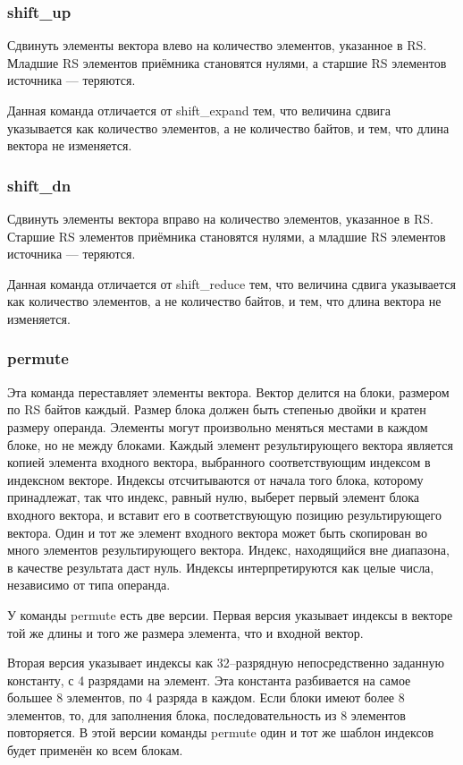 \documentclass[forwardcom.tex]{subfiles}
\begin{document}
\subsubsection{shift\_up}
Сдвинуть элементы вектора влево на количество элементов, указанное в RS. Младшие RS элементов приёмника становятся нулями, а старшие RS элементов источника --- теряются.

Данная команда отличается от shift\_expand тем, что величина сдвига указывается как количество элементов, а не количество байтов, и тем, что длина вектора не изменяется.

\subsubsection{shift\_dn}
Сдвинуть элементы вектора вправо на количество элементов, указанное в RS. Старшие RS элементов приёмника становятся нулями, а младшие RS элементов источника --- теряются.

Данная команда отличается от shift\_reduce  тем, что величина сдвига указывается как количество элементов, а не количество байтов, и тем, что длина вектора не изменяется.

\subsubsection{permute}
Эта команда переставляет элементы вектора. Вектор делится на блоки, размером по RS байтов каждый. Размер блока должен быть степенью двойки и кратен размеру операнда. Элементы могут произвольно меняться местами в каждом блоке, но не между блоками. Каждый элемент результирующего вектора является копией элемента входного вектора, выбранного соответствующим индексом в индексном векторе. Индексы отсчитываются от начала того блока, которому принадлежат, так что индекс, равный нулю, выберет первый элемент блока входного вектора, и вставит его в соответствующую позицию результирующего вектора. Один и тот же элемент входного вектора может быть скопирован во много элементов результирующего вектора. Индекс, находящийся вне диапазона, в качестве результата даст нуль. Индексы интерпретируются как целые числа, независимо от типа операнда.

У команды permute есть две версии. Первая версия указывает индексы в векторе той же длины и того же размера элемента, что и входной вектор.

Вторая версия указывает индексы как 32--разрядную непосредственно заданную константу, с 4 разрядами на элемент. Эта константа  разбивается на самое большее 8 элементов, по 4 разряда в каждом. Если блоки имеют более 8 элементов, то, для заполнения блока, последовательность из 8 элементов повторяется. В этой версии команды permute один и тот же шаблон индексов будет применён ко всем блокам.
\end{document}
